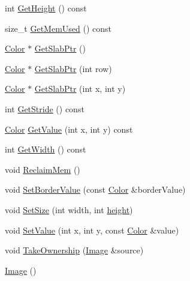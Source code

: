 \begin{DoxyCompactItemize}
\item 
int \hyperlink{classnoise_1_1utils_1_1_image_aded188470833c4f5ff321fb11c973b1e}{Get\+Height} () const 
\item 
size\+\_\+t \hyperlink{classnoise_1_1utils_1_1_image_a713dc911656d7b3e0fffd4ed00c674a7}{Get\+Mem\+Used} () const 
\item 
\hyperlink{classnoise_1_1utils_1_1_color}{Color} $\ast$ \hyperlink{classnoise_1_1utils_1_1_image_a4349e07bc8d153d64c0a21a0e1062701}{Get\+Slab\+Ptr} ()
\item 
\hyperlink{classnoise_1_1utils_1_1_color}{Color} $\ast$ \hyperlink{classnoise_1_1utils_1_1_image_a5e81973f78d9bec8f79dfc63f0e15b4d}{Get\+Slab\+Ptr} (int row)
\item 
\hyperlink{classnoise_1_1utils_1_1_color}{Color} $\ast$ \hyperlink{classnoise_1_1utils_1_1_image_a4bb9044274076ae580f817a3324d17f9}{Get\+Slab\+Ptr} (int x, int y)
\item 
int \hyperlink{classnoise_1_1utils_1_1_image_aae765a3fe9f3f15b87ef9340f3ceddb0}{Get\+Stride} () const 
\item 
\hyperlink{classnoise_1_1utils_1_1_color}{Color} \hyperlink{classnoise_1_1utils_1_1_image_ab923c8098c27b51ac1aa2a79a324f6f8}{Get\+Value} (int x, int y) const 
\item 
int \hyperlink{classnoise_1_1utils_1_1_image_a64ff551a36ab982be8cfbe2cd6c4d23d}{Get\+Width} () const 
\item 
void \hyperlink{classnoise_1_1utils_1_1_image_a7cfa047d3eda1cb39ac75830fe6fd051}{Reclaim\+Mem} ()
\item 
void \hyperlink{classnoise_1_1utils_1_1_image_a5ce5f632933cf6b38a3971c1ead5e186}{Set\+Border\+Value} (const \hyperlink{classnoise_1_1utils_1_1_color}{Color} \&border\+Value)
\item 
void \hyperlink{classnoise_1_1utils_1_1_image_a770c8c35b303a1209464bc65488dc23d}{Set\+Size} (int width, int \hyperlink{_examples_2_bezier_2_app_8cpp_a48083b65ac9a863566dc3e3fff09a5b4}{height})
\item 
void \hyperlink{classnoise_1_1utils_1_1_image_ac99e2764bf63c6fa1fc2c4bec459d049}{Set\+Value} (int x, int y, const \hyperlink{classnoise_1_1utils_1_1_color}{Color} \&value)
\item 
void \hyperlink{classnoise_1_1utils_1_1_image_a33b80f0b9a6b3afd60adbb2e4dc859a7}{Take\+Ownership} (\hyperlink{classnoise_1_1utils_1_1_image}{Image} \&source)
\item 
\hyperlink{classnoise_1_1utils_1_1_image_abb899f576b7339e02a7baa6cd83e0773}{Image} ()
\item 

\end{DoxyCompactItemize}
